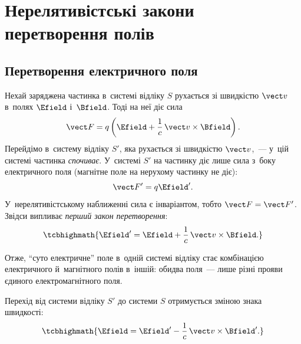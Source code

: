 \section{Нерелятивістські закони перетворення полів}\hypertarget{nonrelativistic-field-transformation}{}

\subsection*{Перетворення електричного поля}

Нехай заряджена частинка в~системі відліку $S$ рухається зі швидкістю $\vect v$ в~полях
$\Efield$ і~$\Bfield$. Тоді на неї діє сила
\begin{equation*}
	\vect F = q\left(\Efield + \frac1c\,\vect v\times\Bfield\right).
\end{equation*}
Перейдімо в~систему відліку $S'$, яка рухається зі швидкістю $\vect v$,~--- у~цій системі
частинка \emph{спочиває}. У~системі $S'$ на частинку діє лише сила з~боку електричного
поля (магнітне поле на нерухому частинку не діє):
\begin{equation*}
	\vect F' = q\Efield'.
\end{equation*}
У~нерелятивістському наближенні сила є інваріантом, тобто $\vect F = \vect F'$. Звідси
випливає \emph{перший закон перетворення}:
\begin{equation}\label{eq:EprimeFromE}
	\tcbhighmath{ \Efield' = \Efield + \frac1c\,\vect v\times\Bfield. }
\end{equation}

Отже, \enquote{суто електричне} поле в~одній системі відліку стає комбінацією електричного
й~магнітного полів в~іншій: обидва поля~--- лише різні прояви єдиного електромагнітного поля.

Перехід від системи відліку $S'$ до системи $S$ отримується зміною знака швидкості:
\begin{equation}\label{eq:EFromEprime}
	\tcbhighmath{ \Efield = \Efield' - \frac1c\,\vect v\times\Bfield'. }
\end{equation}


